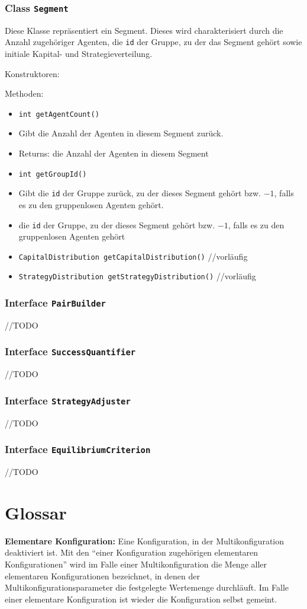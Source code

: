 \documentclass[parskip=full,11pt]{scrartcl}
\begin{document}
\subsubsection{Class \texttt{Segment}}
Diese Klasse repräsentiert ein Segment. Dieses wird charakterisiert durch die Anzahl zugehöriger Agenten, die \texttt{id} der Gruppe, zu der das Segment gehört sowie initiale Kapital- und Strategieverteilung.

Konstruktoren:

Methoden:
\begin{itemize}\itemsep -10pt
\item \texttt{int getAgentCount()}
\item[] Gibt die Anzahl der Agenten in diesem Segment zurück.
\item[] Returns: die Anzahl der Agenten in diesem Segment

\item \texttt{int getGroupId()}
\item[] Gibt die \texttt{id} der Gruppe zurück, zu der dieses Segment gehört bzw. \(-1\), falls es zu den gruppenlosen Agenten gehört.
\item[]die \texttt{id} der Gruppe, zu der dieses Segment gehört bzw. \(-1\), falls es zu den gruppenlosen Agenten gehört

\item \texttt{CapitalDistribution getCapitalDistribution()}
//vorläufig
\item \texttt{StrategyDistribution getStrategyDistribution()}
//vorläufig
\end{itemize}

\subsubsection{Interface \texttt{PairBuilder}}
//TODO

\subsubsection{Interface \texttt{SuccessQuantifier}}
//TODO

\subsubsection{Interface \texttt{StrategyAdjuster}}
//TODO

\subsubsection{Interface \texttt{EquilibriumCriterion}}
//TODO

\section{Glossar}
\textbf{Elementare Konfiguration:}
Eine Konfiguration, in der Multikonfiguration deaktiviert ist. Mit den \enquote{einer Konfiguration zugehörigen elementaren Konfigurationen} wird im Falle einer Multikonfiguration die Menge aller elementaren Konfigurationen bezeichnet, in denen der Multikonfigurationsparameter die festgelegte Wertemenge durchläuft. Im Falle einer elementare Konfiguration ist wieder die Konfiguration selbst gemeint.
\end{document}
